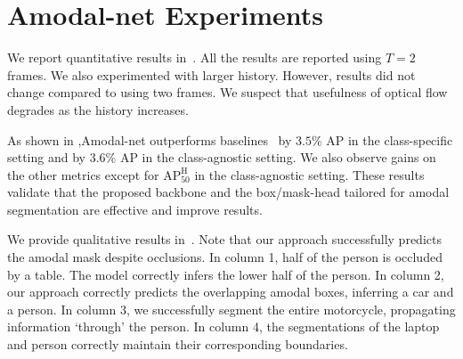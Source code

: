 \section{Amodal-net Experiments}

We report quantitative results in~. 
All the results are reported using $T = 2$ frames. We also experimented with larger history. However, results did not change compared to using two frames. We suspect that usefulness of optical flow degrades as the history increases. %

As shown in ,Amodal-net outperforms baselines~\cite{hu2019sail} by $3.5\%$ AP in the class-specific setting and by $3.6\%$ %
AP in the class-agnostic setting. We also observe gains on the other metrics except for $\text{AP}_{\text{50}}^{\text{H}}$ in the class-agnostic setting. These results validate that the proposed backbone and the box/mask-head tailored for amodal segmentation are effective and improve results.


We provide qualitative results in~. Note that our approach successfully predicts the amodal mask despite occlusions. 
In column 1, half of the person is occluded by a table. The model correctly infers the lower half of the person. In column 2, our approach correctly predicts the overlapping amodal boxes, inferring a car and a person.
In column 3, we successfully segment  the entire motorcycle, propagating information `through' the person.
In column 4, the segmentations of the laptop and person correctly maintain their corresponding boundaries.   



